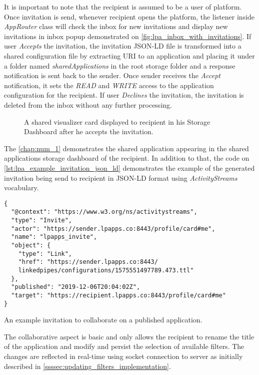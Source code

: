  
It is important to note that the recipient is assumed to be a user of \lpa{} platform. Once invitation is send, whenever recipient opens the platform, the listener inside \textit{AppRouter} class will check the inbox for new invitations and display new invitations in inbox popup demonstrated on \autoref{fig:lpa_inbox_with_invitations}. If user \textit{Accepts} the invitation, the invitation JSON-LD file is transformed into a shared configuration file by extracting URI to an application and placing it under a folder named \textit{sharedApplications} in the root storage folder and a response notification is sent back to the sender. Once sender receives the \textit{Accept} notification, it sets the \textit{READ} and \textit{WRITE} access to the application configuration for the recipient. If user \textit{Declines} the invitation, the invitation is deleted from the inbox without any further processing.

\begin{figure}[h]
\centering
{}
\caption{A shared visualizer card displayed to recipient in his Storage Dashboard after he accepts the invitation.}
\label{fig:lpa_shared_visualizer_card}
\end{figure}

The \autoref{chap:num_1} demonstrates the shared application appearing in the shared applications storage dashboard of the recipient. In addition to that, the code on \autoref{lst:lpa_example_invitation_json_ld} demonstrates the example of the generated invitation being send to recipient in JSON-LD format using \textit{ActivityStreams} vocabulary. 

\begin{listing}[H]    
\begin{verbatim}
{
  "@context": "https://www.w3.org/ns/activitystreams",
  "type": "Invite",
  "actor": "https://sender.lpapps.co:8443/profile/card#me",
  "name": "lpapps_invite",
  "object": {
    "type": "Link",
    "href": "https://sender.lpapps.co:8443/
    linkedpipes/configurations/1575551497789.473.ttl"
  },
  "published": "2019-12-06T20:04:02Z",
  "target": "https://recipient.lpapps.co:8443/profile/card#me"
}
\end{verbatim}
\caption{An example invitation to collaborate on a published application.} 
\label{lst:lpa_example_invitation_json_ld}
\end{listing}

The collaborative aspect is basic and only allows the recipient to rename the title of the application and modify and persist the selection of available filters. The changes are reflected in real-time using socket connection to \solid{} server as initially described in \autoref{ssssec:updating_filters_implementation}.

